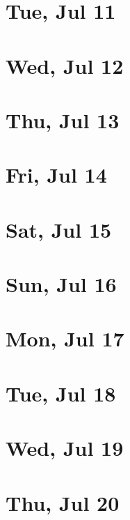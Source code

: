	\section{Tue, Jul 11}
		
	\section{Wed, Jul 12}
		
	\section{Thu, Jul 13}
		
	\section{Fri, Jul 14}
		
	\section{Sat, Jul 15}
		
	\section{Sun, Jul 16}
		
	\section{Mon, Jul 17}
		
	\section{Tue, Jul 18}
		
	\section{Wed, Jul 19}
		
	\section{Thu, Jul 20}
		
